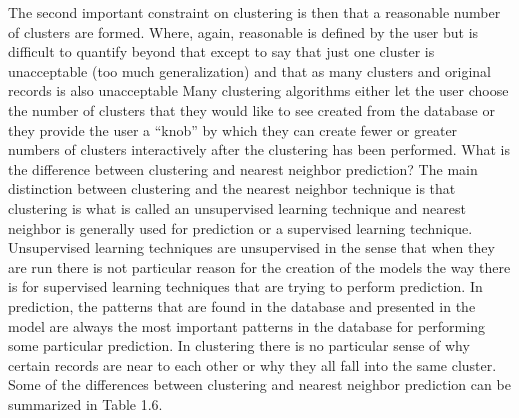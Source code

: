 The second important constraint on clustering is then that a reasonable number of clusters are formed.  Where, again, reasonable is defined by the user but is difficult to quantify beyond that except to say that just one cluster is unacceptable (too much generalization) and that as many clusters and original records is also unacceptable  Many clustering algorithms either let the user choose the number of clusters that they would like to see created from the database or they provide the user a “knob” by which they can create fewer or greater numbers of clusters interactively after the clustering has been performed.
What is the difference between clustering and nearest neighbor prediction?
The main distinction between clustering and the nearest neighbor technique is that clustering is what is called an unsupervised learning technique and nearest neighbor is generally used for prediction or a supervised learning technique.  Unsupervised learning techniques are unsupervised in the sense that when they are run there is not particular reason for the creation of the models the way there is for supervised learning techniques that are trying to perform prediction.  In prediction, the patterns that are found in the database and presented in the model are always the most important patterns in the database for performing some particular prediction.  In clustering there is no particular sense of why certain records are near to each other or why they all fall into the same cluster.  Some of the differences between clustering and nearest neighbor prediction can be summarized in Table 1.6.


